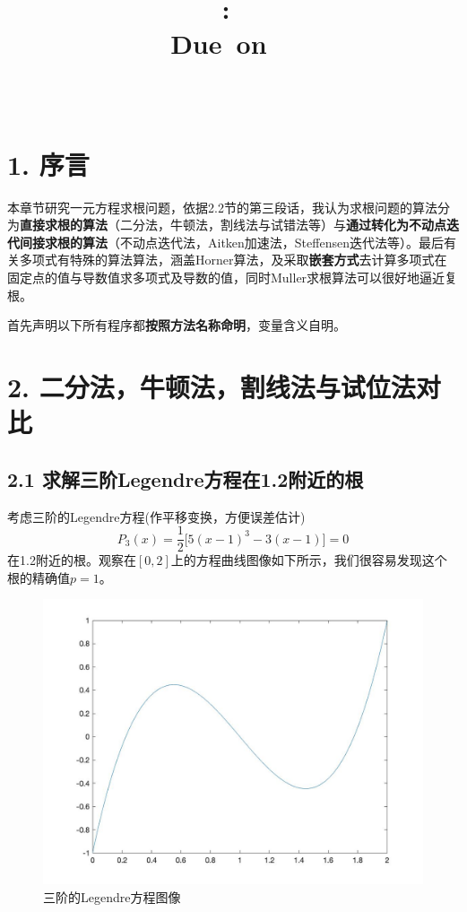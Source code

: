 \documentclass{article}
\title{
    \vspace{2in}
    \textmd{\textbf{\hmwkClass:\ \hmwkTitle}}\\
    \normalsize\vspace{0.1in}\small{Due\ on\ \hmwkDueDate\ }\\
    \vspace{0.1in}\large{\textit{\hmwkClassInstructor\ \hmwkClassTime}}
    \vspace{3in}
}
\author{\hmwkAuthorName}
\date{}
\begin{document}
\maketitle

\pagebreak
\section{1. 序言}

本章节研究一元方程求根问题，依据2.2节的第三段话，我认为求根问题的算法分为\textbf{直接求根的算法}（二分法，牛顿法，割线法与试错法等）与\textbf{通过转化为不动点迭代间接求根的算法}（不动点迭代法，Aitken加速法，Steffensen迭代法等）。最后有关多项式有特殊的算法算法，涵盖Horner算法，及采取\textbf{嵌套方式}去计算多项式在固定点的值与导数值求多项式及导数的值，同时Muller求根算法可以很好地逼近复根。

首先声明以下所有程序都\textbf{按照方法名称命明}，变量含义自明。

\section{2. 二分法，牛顿法，割线法与试位法对比}

\subsection{2.1 求解三阶Legendre方程在1.2附近的根}

考虑三阶的Legendre方程(作平移变换，方便误差估计)
    $$ P_3(x)=\frac{1}{2}\big[5(x-1)^3-3(x-1)\big]=0
    $$
    在1.2附近的根。观察在$[0,2]$上的方程曲线图像如下所示，我们很容易发现这个根的精确值$p=1$。
    \begin{figure}[h]
    \centering
    \includegraphics[scale=0.17]{Legendre.jpg}
    \caption{三阶的Legendre方程图像}
    \label{三阶的Legendre方程图像}
    \end{figure}
\end{document}
